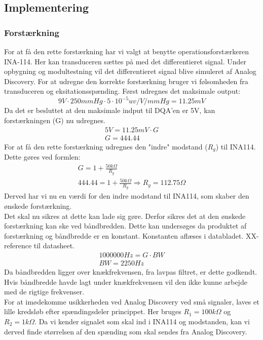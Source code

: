 \subsection{Implementering}
\subsubsection{Forstærkning}
For at få den rette forstærkning har vi valgt at benytte operationsforstærkeren INA-114. Her kan transduceren sættes på med det differentieret signal. Under opbygning og modultestning vil det differentieret signal blive simuleret af Analog Discovery. For at udregne den korrekte forstærkning bruger vi følsomheden fra transduceren og eksitationsspænding.
Først udregnes det maksimale output:   
\begin{equation}
9V\cdot 250mmHg \cdot 5\cdot 10^{-5} uv/V/mmHg  = 11.25mV
\end{equation} 
Da det er besluttet at den maksimale indput til DQA'en er 5V, kan forstærkningen (G) nu udregnes. 
\begin{equation}
\begin{split}
5V= 11.25mV \cdot G \\
G = 444.44
\end{split}
\end{equation}
For at få den rette forstærkning udregnes den "indre" modstand ($ R_g $) til INA114. Dette gøres ved formlen: 
\begin{equation}
\begin{split}
G=1+\frac{50k\Omega}{R_g}\\
444.44= 1+\frac{50k\Omega}{R_g} \Rightarrow R_g= 112.75 \Omega
\end{split}
\end{equation}
Derved har vi nu en værdi for den indre modstand til INA114, som skaber den ønskede forstærkning.\\
Det skal nu sikres at dette kan lade sig gøre. Derfor sikres det at den ønskede forstærkning kan ske ved båndbredden. Dette kan undersøges da produktet af forstærkning og båndbredde er en konstant. Konstanten aflæses i databladet. XX-reference til datasheet. 
\begin{equation}
\begin{split}
1000000 Hz = G\cdot BW \\
BW = 2250 Hz
\end{split}
\end{equation}
Da båndbredden ligger over knækfrekvensen, fra lavpas filtret, er dette godkendt. Hvis båndbredde havde lagt under knækfrekvensen vil den ikke kunne arbejde med de rigtige frekvenser. \\
\newline 
For at imødekomme usikkerheden ved Analog Discovery ved små signaler, laves et lille kredsløb efter spændingsdeler princippet. Her bruges $ R_1=100k\Omega $ og $ R_2 = 1k\Omega $. Da vi kender signalet som skal ind i INA114 og modstanden, kan vi derved finde størrelsen af den spænding som skal sendes fra Analog Discovery.
 
